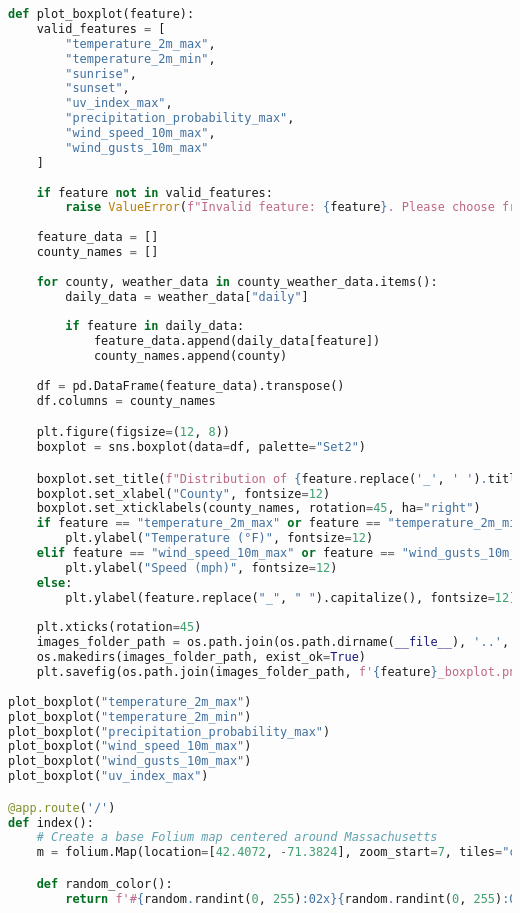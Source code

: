 \documentclass[a4paper, 12pt]{article}
\begin{document}
\begin{lstlisting}[language=Python, caption=Web Server code]
def plot_boxplot(feature):
    valid_features = [
        "temperature_2m_max",
        "temperature_2m_min",
        "sunrise",
        "sunset",
        "uv_index_max",
        "precipitation_probability_max",
        "wind_speed_10m_max",
        "wind_gusts_10m_max"
    ]
    
    if feature not in valid_features:
        raise ValueError(f"Invalid feature: {feature}. Please choose from {', '.join(valid_features)}.")
    
    feature_data = []
    county_names = []
    
    for county, weather_data in county_weather_data.items():
        daily_data = weather_data["daily"]
        
        if feature in daily_data:
            feature_data.append(daily_data[feature]) 
            county_names.append(county)
    
    df = pd.DataFrame(feature_data).transpose()
    df.columns = county_names

    plt.figure(figsize=(12, 8))
    boxplot = sns.boxplot(data=df, palette="Set2")

    boxplot.set_title(f"Distribution of {feature.replace('_', ' ').title()} by County", fontsize=16)
    boxplot.set_xlabel("County", fontsize=12)
    boxplot.set_xticklabels(county_names, rotation=45, ha="right")
    if feature == "temperature_2m_max" or feature == "temperature_2m_min":
        plt.ylabel("Temperature (°F)", fontsize=12)
    elif feature == "wind_speed_10m_max" or feature == "wind_gusts_10m_max":
        plt.ylabel("Speed (mph)", fontsize=12)
    else:
        plt.ylabel(feature.replace("_", " ").capitalize(), fontsize=12)
    
    plt.xticks(rotation=45)
    images_folder_path = os.path.join(os.path.dirname(__file__), '..', 'Frontend', 'static', 'images')
    os.makedirs(images_folder_path, exist_ok=True)
    plt.savefig(os.path.join(images_folder_path, f'{feature}_boxplot.png'), bbox_inches='tight')
    
plot_boxplot("temperature_2m_max")
plot_boxplot("temperature_2m_min")
plot_boxplot("precipitation_probability_max")
plot_boxplot("wind_speed_10m_max")
plot_boxplot("wind_gusts_10m_max")
plot_boxplot("uv_index_max")

@app.route('/')
def index():
    # Create a base Folium map centered around Massachusetts
    m = folium.Map(location=[42.4072, -71.3824], zoom_start=7, tiles="cartodbpositron")

    def random_color():
        return f'#{random.randint(0, 255):02x}{random.randint(0, 255):02x}{random.randint(0, 255):02x}'


\end{lstlisting}
\end{document}
